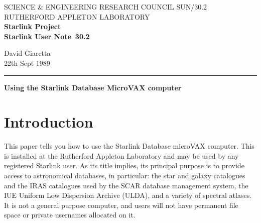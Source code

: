 \pagestyle{myheadings}

\newcommand{\stardoccategory}  {Starlink User Note}
\newcommand{\stardocinitials}  {SUN}
\newcommand{\stardocnumber}    {30.2}
\newcommand{\stardocauthors}   {David Giaretta}
\newcommand{\stardocdate}      {22th Sept 1989}
\newcommand{\stardoctitle}     {Using the Starlink Database MicroVAX computer}

\newcommand{\stardocname}{\stardocinitials /\stardocnumber}
\markright{\stardocname}
\setlength{\textwidth}{160mm}
\setlength{\textheight}{240mm}
\setlength{\topmargin}{-5mm}
\setlength{\oddsidemargin}{0mm}
\setlength{\evensidemargin}{0mm}
\setlength{\parindent}{0mm}
\setlength{\parskip}{\medskipamount}
\setlength{\unitlength}{1mm}


\thispagestyle{empty}
SCIENCE \& ENGINEERING RESEARCH COUNCIL \hfill \stardocname\\
RUTHERFORD APPLETON LABORATORY\\
{\large\bf Starlink Project\\}
{\large\bf \stardoccategory\ \stardocnumber}
\begin{flushright}
\stardocauthors\\
\stardocdate
\end{flushright}
\vspace{-4mm}
\rule{\textwidth}{0.5mm}
\vspace{5mm}
\begin{center}
{\Large\bf \stardoctitle}
\end{center}
\vspace{5mm}

\tableofcontents

\newpage
\section{Introduction}

This paper tells you how to use the Starlink Database microVAX computer.
This is installed at the Rutherford Appleton Laboratory and may be used by any
registered Starlink user.
As its title implies, its 
principal purpose is to provide access to astronomical
databases, in particular: the star and galaxy catalogues and the IRAS catalogues
used by the SCAR database management system, the IUE Uniform Low Dispersion
Archive (ULDA), and a variety of spectral atlases.
It is not a general purpose computer, and users will not have permanent
file space or private usernames allocated on it.

